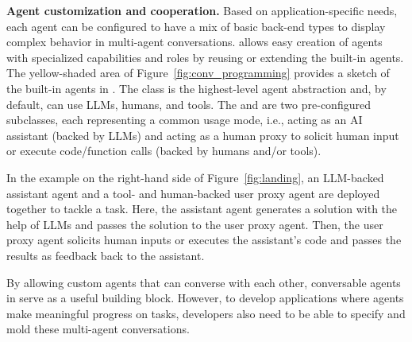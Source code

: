 \textbf{Agent customization and cooperation.} Based on application-specific needs, each agent can be configured to have a mix of basic back-end types to display complex behavior in multi-agent conversations. \libName allows easy creation of agents with specialized capabilities and roles by reusing or extending the built-in agents. The yellow-shaded area of Figure~\ref{fig:conv_programming} provides a sketch of the built-in agents in \libName. The \ResponsiveAgent class is the highest-level agent abstraction and, by default, can use LLMs, humans, and tools. The \AssistantAgent and \UserProxyAgent are two pre-configured \ResponsiveAgent subclasses, each representing a common usage mode, i.e., acting as an AI assistant (backed by LLMs) and acting as a human proxy to solicit human input or execute code/function calls (backed by humans and/or tools). 

In the example on the right-hand side of Figure~\ref{fig:landing}, an LLM-backed assistant agent and a  tool- and human-backed user proxy agent are deployed together to tackle a task.  Here, the assistant agent generates a solution with the help of LLMs and passes the solution to the user proxy agent. Then, the user proxy agent solicits human inputs or executes the assistant's code and passes the results as feedback back to the assistant.

By allowing custom agents that can converse with each other, conversable agents in \libName serve as a useful building block. However, to develop applications where agents make meaningful progress on tasks, developers also need to be able to specify and mold these multi-agent conversations.




